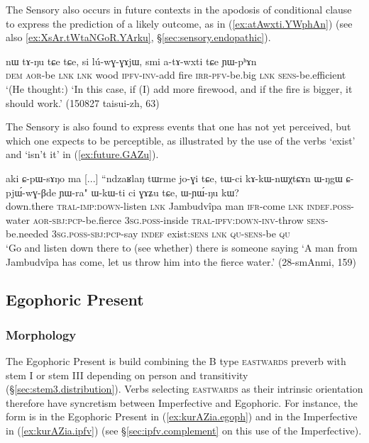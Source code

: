 The Sensory also occurs in future contexts in the apodosis of conditional clause to express the prediction of a likely outcome, as in (\ref{ex:atAwxti.YWphAn}) (see also \ref{ex:XsAr.tWtaNGoR.YArku}, §\ref{sec:sensory.endopathic}).

\begin{exe}
\ex \label{ex:atAwxti.YWphAn}
\gll nɯ tɤ-ŋu tɕe tɕe, si lú-wɣ-ɣɤjɯ, smi a-tɤ-wxti tɕe ɲɯ-pʰɤn \\
\textsc{dem} \textsc{aor}-be \textsc{lnk} \textsc{lnk} wood \textsc{ipfv}-\textsc{inv}-add fire \textsc{irr}-\textsc{pfv}-be.big \textsc{lnk} \textsc{sens}-be.efficient \\
\glt `(He thought:) `In this case, if (I) add more firewood, and if the fire is bigger, it should work.' (150827 taisui-zh, 63)
\end{exe}

The Sensory is also found to express events that one has not yet perceived, but which one expects to be perceptible, as illustrated by the use of the verbs  `exist' and  `isn't it' in (\ref{ex:future.GAZu}).

\begin{exe}
\ex \label{ex:future.GAZu}
\gll  aki ɕ-pɯ-sɤŋo ma [...] ``ndzaʁlaŋ tɯrme jo-ɣi tɕe, tɯ-ci kɤ-kɯ-nɯχtɕɤn ɯ-ŋgɯ ɕ-pjɯ́-wɣ-βde ɲɯ-ra" ɯ-kɯ-ti ci ɣɤʑu tɕe, ɯ-ɲɯ́-ŋu kɯ? \\
down.there \textsc{tral}-\textsc{imp}:\textsc{down}-listen \textsc{lnk} { } Jambudvîpa man \textsc{ifr}-come \textsc{lnk} \textsc{indef}.\textsc{poss}-water \textsc{aor}-\textsc{sbj}:\textsc{pcp}-be.fierce \textsc{3sg}.\textsc{poss}-inside \textsc{tral}-\textsc{ipfv}:\textsc{down}-\textsc{inv}-throw \textsc{sens}-be.needed \textsc{3sg}.\textsc{poss}-\textsc{sbj}:\textsc{pcp}-say \textsc{indef} exist:\textsc{sens} \textsc{lnk} \textsc{qu}-\textsc{sens}-be \textsc{qu} \\
\glt `Go and listen down there to (see whether) there is someone saying `A man from Jambudvîpa has come, let us throw him into the fierce water.' (28-smAnmi, 159)
\end{exe}

\subsection{Egophoric Present} \label{sec:egophoric}


\subsubsection{Morphology} \label{sec:egophoric.morphology}
The Egophoric Present is build combining the B type \textsc{eastwards}  preverb with stem I or stem III depending on person and transitivity (§\ref{sec:stem3.distribution}). Verbs selecting \textsc{eastwards} as their intrinsic orientation therefore have syncretism between Imperfective and Egophoric. For instance, the form  is in the Egophoric Present in (\ref{ex:kurAZia.egoph}) and in the Imperfective in (\ref{ex:kurAZia.ipfv}) (see §\ref{sec:ipfv.complement} on this use of the Imperfective).

